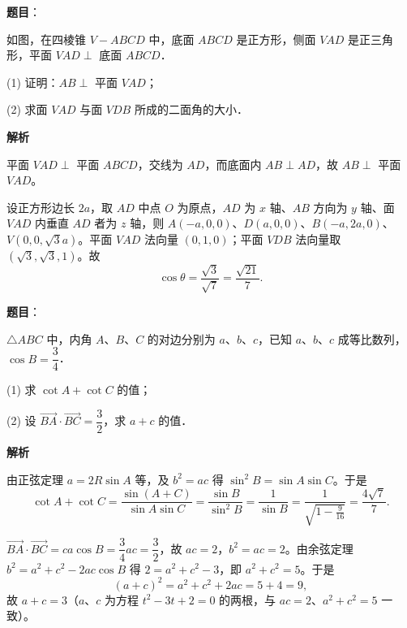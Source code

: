 \begin{answer}

\textbf{题目}：

如图，在四棱锥 $V - ABCD$ 中，底面 $ABCD$ 是正方形，侧面 $VAD$ 是正三角形，平面 $VAD \perp$ 底面 $ABCD$．

(1) 证明：$AB \perp$ 平面 $VAD$；

(2) 求面 $VAD$ 与面 $VDB$ 所成的二面角的大小．
\nopagebreak[4]
\begin{center}\end{center}
\nopagebreak[4]
\textbf{解析}


平面 $VAD \perp$ 平面 $ABCD$，交线为 $AD$，而底面内 $AB \perp AD$，故 $AB \perp$ 平面 $VAD$。


设正方形边长 $2a$，取 $AD$ 中点 $O$ 为原点，$AD$ 为 $x$ 轴、$AB$ 方向为 $y$ 轴、面 $VAD$ 内垂直 $AD$ 者为 $z$ 轴，则 $A(-a, 0, 0)$、$D(a, 0, 0)$、$B(-a, 2a, 0)$、$V(0, 0, \sqrt{3}a)$。平面 $VAD$ 法向量 $(0, 1, 0)$；平面 $VDB$ 法向量取 $(\sqrt{3}, \sqrt{3}, 1)$。故
\nopagebreak[4]
\[
\cos\theta = \frac{\sqrt{3}}{\sqrt{7}} = \frac{\sqrt{21}}{7}.
\]



\end{answer}
\begin{answer}

\textbf{题目}：

$\triangle ABC$ 中，内角 $A$、$B$、$C$ 的对边分别为 $a$、$b$、$c$，已知 $a$、$b$、$c$ 成等比数列，$\cos B = \dfrac{3}{4}$．

(1) 求 $\cot A + \cot C$ 的值；

(2) 设 $\overrightarrow{BA} \cdot \overrightarrow{BC} = \dfrac{3}{2}$，求 $a + c$ 的值．

\textbf{解析}


由正弦定理 $a = 2R\sin A$ 等，及 $b^2 = ac$ 得 $\sin^2 B = \sin A\sin C$。于是
\nopagebreak[4]
\[
\cot A + \cot C = \frac{\sin(A + C)}{\sin A \sin C} = \frac{\sin B}{\sin^2 B} = \frac{1}{\sin B} = \frac{1}{\sqrt{1 - \frac{9}{16}}} = \frac{4\sqrt{7}}{7}.
\]


$\overrightarrow{BA}\cdot\overrightarrow{BC} = ca\cos B = \dfrac{3}{4}ac = \dfrac{3}{2}$，故 $ac = 2$，$b^2 = ac = 2$。由余弦定理 $b^2 = a^2 + c^2 - 2ac\cos B$ 得 $2 = a^2 + c^2 - 3$，即 $a^2 + c^2 = 5$。于是
\nopagebreak[4]
\[
(a + c)^2 = a^2 + c^2 + 2ac = 5 + 4 = 9,
\]
故 $a + c = 3$（$a$、$c$ 为方程 $t^2 - 3t + 2 = 0$ 的两根，与 $ac = 2$、$a^2 + c^2 = 5$ 一致）。



\end{answer}
